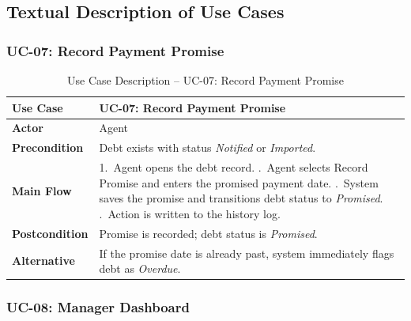 \documentclass[12pt,a4paper]{report}
\newcommand{\reporttablesetup}{%
  \small%
  \setlength{\tabcolsep}{5pt}%
  \renewcommand{\arraystretch}{1.38}%
  \arrayrulecolor{framegray}%
}
\begin{document}
\subsection{Textual Description of Use Cases}

\subsubsection{UC-07: Record Payment Promise}

\begin{table}[H]
  \centering
  \renewcommand{\arraystretch}{1.3}
  \reporttablesetup
  \begin{tabularx}{\textwidth}{|>{\bfseries}p{3.1cm}|Y|}
    \hline
    Use Case      & UC-07: Record Payment Promise \\
    \hline
    Actor         & Agent \\
    \hline
    Precondition  & Debt exists with status \textit{Notified} or \textit{Imported}. \\
    \hline
    Main Flow     & 1.\ Agent opens the debt record. .\ Agent selects Record Promise and enters the promised payment date. .\ System saves the promise and transitions debt status to \textit{Promised}. .\ Action is written to the history log. \\
    \hline
    Postcondition & Promise is recorded; debt status is \textit{Promised}. \\
    \hline
    Alternative   & If the promise date is already past, system immediately flags debt as \textit{Overdue}. \\
    \hline
  \end{tabularx}
  \caption{Use Case Description -- UC-07: Record Payment Promise}
  \label{tab:uc07}
\end{table}

\subsubsection{UC-08: Manager Dashboard}
\end{document}

